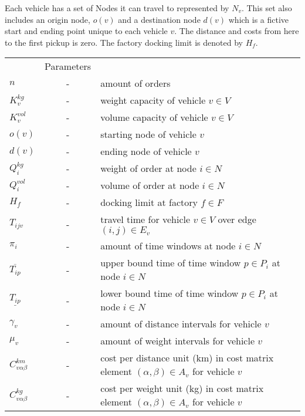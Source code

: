 \documentclass[../main.tex]{subfiles}
\begin{document}
Each vehicle has a set of Nodes it can travel to represented by $N_v$.
This set also includes an origin node, $o(v)$ and a destination node $d(v)$ which is a fictive start and ending point unique to each vehicle $v$. 
The distance and costs from here to the first pickup is zero.
The factory docking limit is denoted by $H_f$. 
\begin{tabular}{l c l }
    			        &Parameters 							\\ 
    $n    	            $   &-& amount of orders     					\\
    $K_v^{kg}  	            $   &-& weight capacity of vehicle $v\in V$	 			\\
    $K_v^{vol} 	            $   &-& volume capacity of vehicle $v\in V$	 			\\
    $o(v)                   $   &-& starting node of vehicle $v$                                \\
    $d(v)                   $   &-& ending node of vehicle $v$                                  \\
    $Q_i^{kg}  	            $	&-& weight of order at node $i\in N$				\\
    $Q_i^{vol} 	            $	&-& volume of order at node $i\in N$				\\
    $H_f  	            $	&-& docking limit at factory $f\in F$				\\
    $T_{ijv}                $ 	&-& travel time for vehicle $v\in V$ over edge $(i,j)\in E_v$	\\
    $\pi_i	            $	&-& amount of time windows at node $i\in N$			\\ 
    $\overline{T_{ip}}      $   &-& upper bound time of time window $p\in P_i$ at node $i\in N$ \\
    $\underline{T_{ip}}     $	&-& lower bound time of time window $p\in P_i$ at node $i\in N$ \\
    $\gamma_v               $   &-& amount of distance intervals for vehicle $v$                \\
    $\mu_v                  $   &-& amount of weight intervals for vehicle $v$                  \\                   
    $C^{km}_{v\alpha\beta}  $	&-& cost per distance unit (km) in cost matrix element 
                                    $(\alpha, \beta) \in A_v$ for vehicle $v$	                \\
    $C^{kg}_{v\alpha\beta}  $	&-& cost per weight unit (kg) in cost matrix element 
                                    $(\alpha, \beta) \in A_v$ for vehicle $v$	                \\

\end{tabular}
\end{document}
